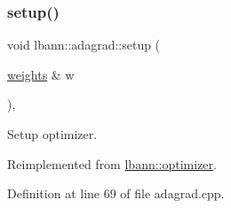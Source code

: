 \subsubsection{\texorpdfstring{setup()}{setup()}\hspace{0.1cm}{\footnotesize\ttfamily [1/2]}}
{\footnotesize\ttfamily void lbann\+::adagrad\+::setup (\begin{DoxyParamCaption}\item[{\hyperlink{classlbann_1_1weights}{weights} \&}]{w }\end{DoxyParamCaption})\hspace{0.3cm}{\ttfamily [override]}, {\ttfamily [virtual]}}

Setup optimizer. 

Reimplemented from \hyperlink{classlbann_1_1optimizer_a7641a88b3c166df2d974a298622b992b}{lbann\+::optimizer}.



Definition at line 69 of file adagrad.\+cpp.


